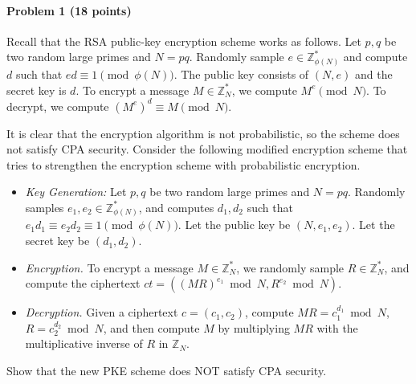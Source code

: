 \paragraph{Problem 1 (18 points)}
Recall that the RSA public-key encryption scheme works as follows. Let $p,q$ be two random large primes and $N=pq$. Randomly sample $e\in\mathbb{Z}_{\phi(N)}^*$ and compute $d$ such that $ed\equiv 1\pmod{\phi(N)}$. The public key consists of $(N,e)$ and the secret key is $d$. To encrypt a message $M\in\mathbb{Z}_N^*$, we compute $M^e\pmod N$. To decrypt, we compute $(M^{e})^d\equiv M\pmod N$. 

It is clear that the encryption algorithm is not probabilistic, so the scheme does not satisfy CPA security. Consider the following modified encryption scheme that tries to strengthen the encryption scheme with probabilistic encryption. 
\begin{itemize}
    \item \emph{Key Generation:} Let $p,q$ be two random large primes and $N=pq$. Randomly samples $e_1,e_2\in\mathbb{Z}_{\phi(N)}^*$, and computes $d_1,d_2$ such that $e_1d_1\equiv e_2d_2\equiv 1\pmod{\phi(N)}$.
    Let the public key be $(N, e_1, e_2)$. Let the secret key be $(d_1, d_2)$.
    \item \emph{Encryption.} To encrypt a message $M\in\mathbb{Z}_N^*$, we randomly sample $R\in\mathbb{Z}_N^*$, and compute the ciphertext $ct=((MR)^{e_1} \bmod N, R^{e_2}\bmod N)$. 
    \item \emph{Decryption.} Given a ciphertext $c = (c_1, c_2)$, compute $MR = c_1^{d_1} \bmod N$, $R = c_2^{d_2} \bmod N$, 
    and then compute $M$ by multiplying $MR$ with the multiplicative inverse of $R$ in $\mathbb{Z}_N$. 
\end{itemize} 

Show that the new PKE scheme does NOT satisfy CPA security.